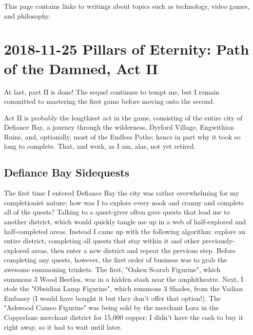 \documentclass{article}
\begin{document}
This page contains links to writings about topics such as technology, video games, and philosophy.

\tableofchildlinks*


\section{2018-11-25 Pillars of Eternity: Path of the Damned, Act II}
At last, part II is done!  The sequel continues to tempt me, but I remain committed to mastering the first game before moving onto the second.

Act II is probably the lengthiest act in the game, consisting of the entire city of Defiance Bay, a journey through the wilderness, Dyrford Village, Engwithian Ruins, and, optionally, most of the Endless Paths; hence in part why it took so long to complete.  That, and work, as I am, alas, not yet retired.

\subsection{Defiance Bay Sidequests}
The first time I entered Defiance Bay the city was rather overwhelming for my completionist nature; how was I to explore every nook and cranny and complete all of the quests?  Talking to a quest-giver often gave quests that lead me to another district, which would quickly tangle me up in a web of half-explored and half-completed areas.  Instead I came up with the following algorithm: explore an entire district, completing all quests that stay within it and other previously-explored areas, then enter a new district and repeat the previous step.  Before completing any quests, however, the first order of business was to grab the awesome summoning trinkets.  The first, "Oaken Scarab Figurine", which summons 3 Wood Beetles, was in a hidden stash near the amphitheatre.  Next, I stole the "Obsidian Lamp Figurine", which summons 3 Shades, from the Vailian Embassy (I would have bought it but they don't offer that option!).  The "Ashwood Cameo Figurine" was being sold by the merchant Lora in the Copperlane merchant district for 15,000 copper; I didn't have the cash to buy it right away, so it had to wait until later.
\end{document}
